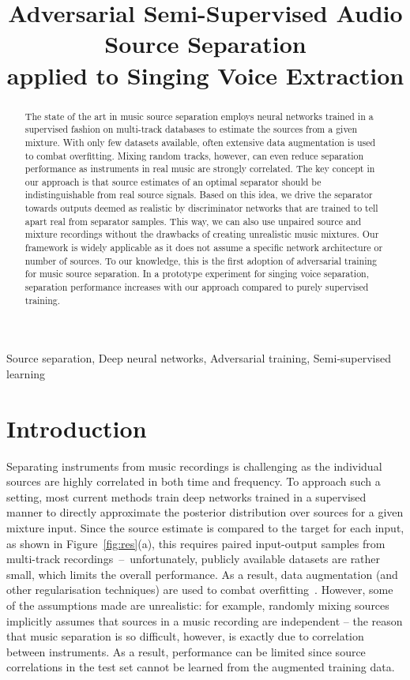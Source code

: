 \documentclass{article}
\title{Adversarial Semi-Supervised Audio Source Separation \\applied to Singing Voice Extraction}
\newcommand\blfootnote[1]{%
  \begingroup
  \renewcommand\thefootnote{}\footnote{#1}%
  \addtocounter{footnote}{-1}%
  \endgroup
}
\begin{document}
\ninept

\maketitle

\begin{abstract}
The state of the art in music source separation employs neural networks trained in a supervised fashion on multi-track databases to estimate the sources from a given mixture. With only few datasets available, often extensive data augmentation is used to combat overfitting. Mixing random tracks, however, can even reduce separation performance as instruments in real music are strongly correlated. The key concept in our approach is that source estimates of an optimal separator should be indistinguishable from real source signals. Based on this idea, we drive the separator towards outputs deemed as realistic by discriminator networks that are trained to tell apart real from separator samples. This way, we can also use unpaired source and mixture recordings without the drawbacks of creating unrealistic music mixtures. Our framework is widely applicable as it does not assume a specific network architecture or number of sources. To our knowledge, this is the first adoption of adversarial training for music source separation. In a prototype experiment for singing voice separation, separation performance increases with our approach compared to purely supervised training.
\end{abstract}
%
\begin{keywords}
Source separation, Deep neural networks, Adversarial training, Semi-supervised learning
\end{keywords}
%
\section{Introduction}
\label{sec:intro}

Separating instruments from music recordings is challenging as the individual sources are highly correlated in both time and frequency.
To approach such a setting, most current methods train deep networks trained in a supervised manner to directly approximate the posterior distribution over sources for a given mixture input.
Since the source estimate is compared to the target for each input, as shown in Figure~\ref{fig:res}(a), this requires paired input-output samples from multi-track recordings~--~unfortunately, publicly available datasets are rather small, which limits the overall performance.
As a result, data augmentation (and other regularisation techniques) are used to combat overfitting~\cite{Uhlich2017,Miron2017}.
However, some of the assumptions made are unrealistic: for example, randomly mixing sources implicitly assumes that sources in a music recording are independent -- the reason that music separation is so difficult, however, is exactly due to correlation between instruments.
As a result, performance can be limited since source correlations in the test set cannot be learned from the augmented training data.
\end{document}
